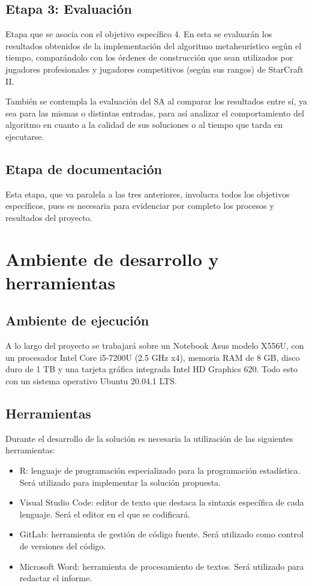 \subsection{Etapa 3: Evaluaci\'on}

Etapa que se asocia con el objetivo específico 4. En esta se evaluarán los resultados obtenidos de la implementación del algoritmo metaheurístico según el tiempo, comparándolo con los órdenes de construcción que sean utilizados por jugadores profesionales y jugadores competitivos (según sus rangos) de StarCraft II.

También se contempla la evaluación del SA al comparar los resultados entre sí, ya sea para las mismas o distintas entradas, para así analizar el comportamiento del algoritmo en cuanto a la calidad de sus soluciones o al tiempo que tarda en ejecutarse.

\subsection{Etapa de documentación}

Esta etapa, que va paralela a las tres anteriores, involucra todos los objetivos específicos, pues es necesaria para evidenciar por completo los procesos y resultados del proyecto.

\section{Ambiente de desarrollo y herramientas}

\subsection{Ambiente de ejecución}

A lo largo del proyecto se trabajará sobre un Notebook Asus modelo X556U, con un procesador Intel Core i5-7200U (2.5 GHz x4), memoria RAM de 8 GB, disco duro de 1 TB y una tarjeta gráfica integrada Intel HD Graphics 620. Todo esto con un sistema operativo Ubuntu 20.04.1 LTS.

\subsection{Herramientas}

Durante el desarrollo de la solución es necesaria la utilización de las siguientes herramientas: 
\begin{itemize}
\item R: lenguaje de programación especializado para la programación estadística. Será utilizado para implementar la solución propuesta. 
\item Visual Studio Code: editor de texto que destaca la sintaxis específica de cada lenguaje. Será el editor en el que se codificará. 
\item GitLab: herramienta de gestión de código fuente. Será utilizado como control de versiones del código. 
\item Microsoft Word: herramienta de procesamiento de textos. Será utilizado para redactar el informe.
\end{itemize}

